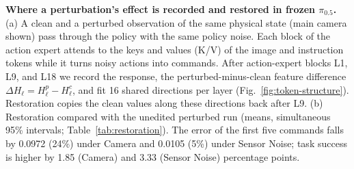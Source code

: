 \textbf{Where a perturbation's effect is recorded and restored in frozen $\pi_{0.5}$.}
(a) A clean and a perturbed observation of the same physical state (main camera shown) pass through the policy with the same policy noise. Each block of the action expert attends to the keys and values (K/V) of the image and instruction tokens while it turns noisy actions into commands. After action-expert blocks L1, L9, and L18 we record the response, the perturbed-minus-clean feature difference $\Delta H_\ell = H^{p}_\ell - H^{c}_\ell$, and fit 16 shared directions per layer (Fig.~\ref{fig:token-structure}). Restoration copies the clean values along these directions back after L9.
(b) Restoration compared with the unedited perturbed run (means, simultaneous 95\% intervals; Table~\ref{tab:restoration}). The error of the first five commands falls by 0.0972 (24\%) under Camera and 0.0105 (5\%) under Sensor Noise; task success is higher by 1.85 (Camera) and 3.33 (Sensor Noise) percentage points.
